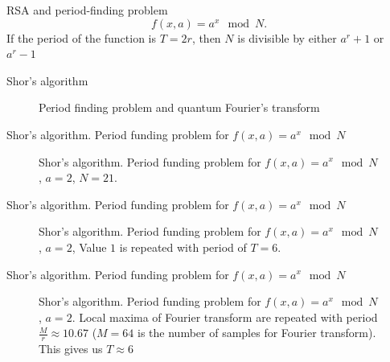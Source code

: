 \documentclass[10pt,pdf,hyperref={unicode}]{beamer}
\begin{document}
\begin{frame}{RSA and period-finding problem}
\[
f\left(x, a\right) = a^x \mod N.
\]
If the period of the function is $T = 2r$, then
$N$ is divisible by either $a^r + 1$ or $a^r - 1$
\end{frame}

\begin{frame}{Shor's algorithm}
\begin{figure}
\centering

\scalebox{.8}{}

\caption{ Period finding problem and quantum Fourier's transform}
\end{figure}
\end{frame}


\begin{frame}{Shor's algorithm. Period funding problem for 
  $f\left(x, a\right) = a^x \mod{N}$}
\begin{figure}
\centering

\scalebox{.65}{}

\caption{Shor's algorithm. Period funding problem for 
  $f\left(x, a\right) = a^x \mod{N}$, $a=2$, $N = 21$.}
\end{figure}
\end{frame}

\begin{frame}{Shor's algorithm. Period funding problem for
  $f\left(x, a\right) = a^x \mod{N}$}
\begin{figure}
\centering

\scalebox{.65}{}

\caption{Shor's algorithm. Period funding problem for
  $f\left(x, a\right) = a^x \mod{N}$, $a=2$,  
  Value $1$ is repeated with period of $T=6$.}
\end{figure}
\end{frame}

\begin{frame}{Shor's algorithm. Period funding problem for
  $f\left(x, a\right) = a^x \mod{N}$}
\begin{figure}
\centering

\scalebox{.6}{}

\caption{Shor's algorithm. Period funding problem for
  $f\left(x, a\right) = a^x \mod{N}$, $a=2$. 
  Local maxima of Fourier transform are repeated with period
  $\frac{M}{r} \approx 10.67$ ($M = 64$ is the number of samples for
  Fourier transform). This gives us $T\approx 6$}
\end{figure}
\end{frame}
\end{document}
